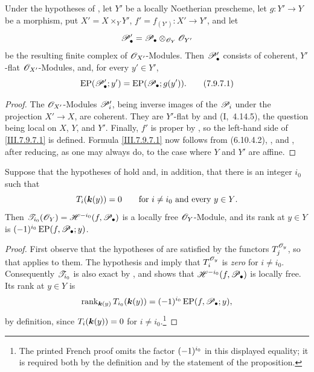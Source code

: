 \begin{proposition}[7.9.7]
\label{III.7.9.7}
Under the hypotheses of , let $Y'$ be a
locally Noetherian prescheme, let $g:Y'\to Y$ be a
morphism, put $X'=X\times_Y Y'$, $f'=f_{(Y')}:X'\to Y'$,
and let
\[
  \mathscr{P}'_\bullet
  =
  \mathscr{P}_\bullet\otimes_{\mathscr{O}_Y}\mathscr{O}_{Y'}
\]
be the resulting finite complex of $\mathscr{O}_{X'}$-Modules.
Then $\mathscr{P}'_\bullet$ consists of coherent,
$Y'$-flat $\mathscr{O}_{X'}$-Modules, and, for every
$y'\in Y'$,
\[
  \operatorname{EP}(\mathscr{P}'_\bullet;y')
  =
  \operatorname{EP}(\mathscr{P}_\bullet;g(y')).
  \tag{7.9.7.1}\label{III.7.9.7.1}
\]
\end{proposition}

\begin{proof}
The $\mathscr{O}_{X'}$-Modules $\mathscr{P}'_i$, being inverse images
of the $\mathscr{P}_i$ under the projection $X'\to X$, are
coherent.  They are $Y'$-flat by  and
(I,~4.14.5), the question being local on $X$, $Y$,
and $Y'$.  Finally, $f'$ is proper by
, so the left-hand side of
\eqref{III.7.9.7.1} is defined.  Formula
\eqref{III.7.9.7.1} now follows from
\textup{(6.10.4.2)}, , and
, after reducing, as one may always do, to
the case where $Y$ and $Y'$ are affine.
\end{proof}

\begin{proposition}[7.9.8]
\label{III.7.9.8}
Suppose that the hypotheses of  hold and,
in addition, that there is an integer $i_0$ such that
\[
  T_i(\boldsymbol{k}(y))=0
  \qquad\text{for $i\neq i_0$ and every $y\in Y$.}
\]
Then $\mathscr{T}_{i_0}(\mathscr{O}_Y)
=
\mathscr{H}^{-i_0}(f,\mathscr{P}_\bullet)$
is a locally free $\mathscr{O}_Y$-Module, and its rank at
$y\in Y$ is $(- 1)^{i_0}\operatorname{EP}(f,\mathscr{P}_\bullet;y)$.
\end{proposition}

\begin{proof}
First observe that the hypotheses of  are
satisfied by the functors $T^{\mathscr{O}_y}_j$, so that
 applies to them.  The hypothesis and
 imply that
$T^{\mathscr{O}_y}_i$ is \emph{zero} for $i\neq i_0$.
Consequently $\mathscr{T}_{i_0}$ is also exact by
, and  shows that
$\mathscr{H}^{-i_0}(f,\mathscr{P}_\bullet)$ is locally free.
Its rank at $y\in Y$ is
\[
  \operatorname{rank}_{\boldsymbol{k}(y)}
    T_{i_0}(\boldsymbol{k}(y))
  =
  (- 1)^{i_0}\operatorname{EP}(f,\mathscr{P}_\bullet;y),
\]
by definition, since $T_i(\boldsymbol{k}(y))=0$ for
$i\neq i_0$.\footnote{The printed French proof omits the
factor $(- 1)^{i_0}$ in this displayed equality; it is
required both by the definition and by the statement of
the proposition.}
\end{proof}

